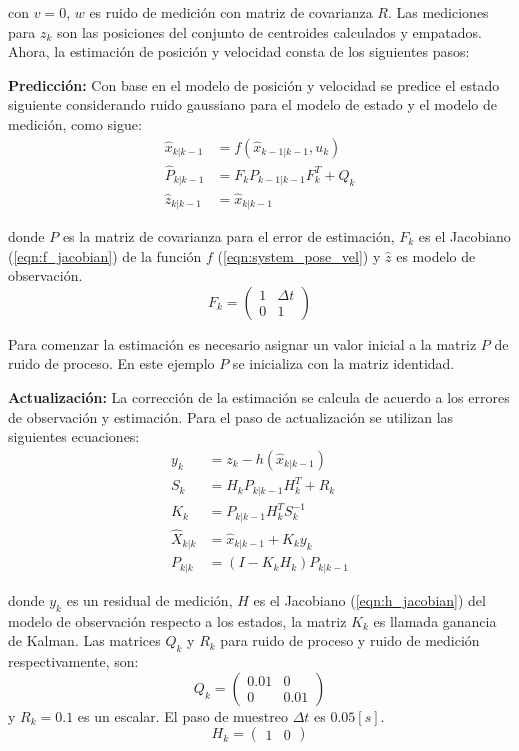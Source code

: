 con $v = 0$, $w$ es ruido de medición con matriz de covarianza $R$. Las mediciones para $z_k$ son las posiciones del conjunto de centroides calculados y empatados. Ahora, la estimación de posición y velocidad consta de los siguientes pasos:

\textbf{Predicción:} Con base en el modelo de posición y velocidad se predice el estado siguiente considerando ruido gaussiano para el modelo de estado y el modelo de medición, como sigue:
\begin{align*} 
    \hat{x}_{k|k-1} &= f(\hat{x}_{k-1|k-1}, u_{k}) \\
    \hat{P}_{k|k-1} &= F_k P_{k-1|k-1} F_{k}^{T} + Q_{k} \\
    \hat{z}_{k|k-1} &= \hat{x}_{k|k-1}
\end{align*}
    
donde $P$ es la matriz de covarianza para el error de estimación, $F_k$ es el Jacobiano (\ref{eqn:f_jacobian}) de la función $f$ (\ref{eqn:system_pose_vel}) y $\hat{z}$ es modelo de observación.
\begin{equation}
    F_k = \begin{pmatrix}
        1 & \Delta t \\
        0 & 1
    \end{pmatrix}
    \label{eqn:f_jacobian}
\end{equation}

Para comenzar la estimación es necesario asignar un valor inicial a la matriz $P$ de ruido de proceso. En este ejemplo $P$ se inicializa con la matriz identidad.

\textbf{Actualización:} La corrección de la estimación se calcula de acuerdo a los errores de observación y estimación. Para el paso de actualización se utilizan las siguientes ecuaciones:
\begin{align*}
    y_k &= z_{k} - h(\hat{x}_{k|k-1}) \\
    S_k &= H_k P_{k|k-1} H_{k}^{T} + R_k \\
    K_k &= P_{k|k-1} H_{k}^T S_{k}^{-1} \\
    \hat{X}_{k|k} &= \hat{x}_{k|k-1} + K_k y_{k} \\
    P_{k|k} &= (I - K_k H_k) P_{k|k-1}
\end{align*}

donde $y_k$ es un residual de medición, $H$ es el Jacobiano (\ref{eqn:h_jacobian}) del modelo de observación respecto a los estados, la matriz $K_k$ es llamada ganancia de Kalman. Las matrices $Q_k$ y $R_k$ para ruido de proceso y ruido de medición respectivamente, son:
\begin{equation*}
    Q_k = \begin{pmatrix}
        0.01 & 0 \\
        0 & 0.01
    \end{pmatrix}
\end{equation*}
y $R_k = 0.1$ es un escalar. El paso de muestreo $\Delta t$ es $0.05 [s]$.
\begin{equation}
    H_k=\begin{pmatrix}
            1 & 0
        \end{pmatrix}
    \label{eqn:h_jacobian}
\end{equation}

